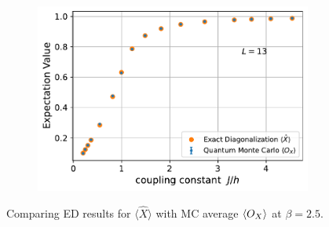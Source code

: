 \documentclass[../thesis_main.tex]{subfiles}
\begin{document}
\begin{figure}[!htb]
    \centering
    \begin{subfigure}[b]{0.55\textwidth}
        \centering
        \includegraphics[width=\textwidth]{images/13_site/L=13_X.pdf}
    \end{subfigure}
    \caption{Comparing ED results for $\langle \hat{X} \rangle$ with MC average $\expval{O_X}$ at $\beta = 2.5$.}
    \label{expvalX_ED_vs_MC_13}
\end{figure}
\vspace*{1em}
\end{document}
